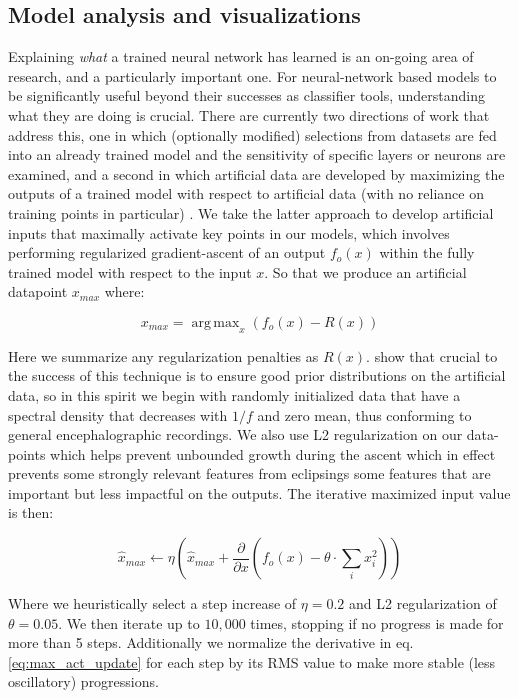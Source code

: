 \documentclass[utf8]{frontiersSCNS} %
\DeclareMathOperator*{\argmaxA}{arg\,max}
\begin{document}
\subsection{Model analysis and visualizations} \label{sec:max_act}

Explaining {\em what} a trained neural network has learned is an on-going area of research, and a particularly important one. For neural-network based models to be significantly useful beyond their successes as classifier tools, understanding what they are doing is crucial. There are currently two directions of work that address this, one in which (optionally modified) selections from datasets are fed into an already trained model and the sensitivity of specific layers or neurons are examined, and a second in which artificial data are developed by maximizing the outputs of a trained model with respect to artificial data (with no reliance on training points in particular) \cite{Yosinski2015}. We take the latter approach to develop artificial inputs that maximally activate key points in our models, which involves performing regularized gradient-ascent of an output $f_o(x)$ within the fully trained model with respect to the input $x$. So that we produce an artificial datapoint $x_{max}$ where:

\begin{equation} \label{eq:max_act}
  x_{max} = \argmaxA_x(f_o(x) - R(x))
\end{equation}

Here we summarize any regularization penalties as $R(x)$. \cite{Yosinski2015} show that crucial to the success of this technique is to ensure good prior distributions on the artificial data, so in this spirit we begin with randomly initialized data that have a spectral density that decreases with $1/f$ and zero mean, thus conforming to general encephalographic recordings. We also use L2 regularization on our data-points which helps prevent unbounded growth during the ascent which in effect prevents some strongly relevant features from eclipsings some features that are important but less impactful on the outputs. The iterative maximized input value is then:

\begin{equation} \label{eq:max_act_update}
  \hat{x}_{max} \leftarrow \eta \left(\hat{x}_{max} + \frac{\partial }{\partial x}(f_o(x) - \theta \cdot {}\sum_ix_i^2) \right)
\end{equation}

Where we heuristically select a step increase of $\eta = 0.2$ and L2 regularization of $\theta = 0.05$. We then iterate up to $10,000$ times, stopping if no progress is made for more than 5 steps. Additionally we normalize the derivative in eq. \ref{eq:max_act_update} for each step by its RMS value to make more stable (less oscillatory) progressions.
\end{document}
